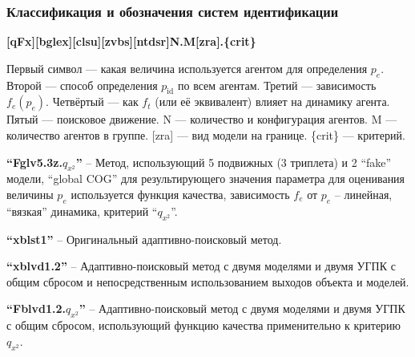 \documentclass[10pt,utf8]{beamer}
\begin{document}

\begin{frame}
  \frametitle{Классификация и обозначения систем идентификации}

  \begin{center}
    \textbf{[qFx][bglex][clsu][zvbs][ntdsr]N.M[zra].\{crit\}}
  \end{center}

  Первый символ --- какая величина используется агентом для определения $p_e$.
  Второй --- способ определения $p_\mathrm{id}$ по всем агентам.
  Третий --- зависимость $f_e(p_e)$.
  Четвёртый --- как $f_t$ (или её эквивалент) влияет на динамику агента.
  Пятый --- поисковое движение.
  N --- количество и конфигурация агентов.
  M --- количество агентов в группе.
  [zra] --- вид модели на границе.
  \{crit\} --- критерий.

  \textbf{``Fglv5.3z.$q_{x^2}$''} -- Метод, использующий 5 подвижных (3 триплета) и 2 ``fake'' модели,
  ``global COG'' для результирующего значения параметра
  для оценивания величины $p_e$ используется функция качества,
  зависимость $f_e$ от $p_e$ -- линейная, ``вязкая'' динамика, критерий ``$q_{x^2}$''.

  \textbf{``xblst1''} -- Оригинальный адаптивно-поисковый метод.

  \textbf{``xblvd1.2''} -- Адаптивно-поисковый метод с двумя моделями и двумя УГПК с общим сбросом
    и непосредственным использованием выходов объекта и моделей.

  \textbf{``Fblvd1.2.$q_{x^2}$''} -- Адаптивно-поисковый метод с двумя моделями и двумя УГПК с общим сбросом,
   использующий функцию качества применительно к критерию $q_{x^2}$.
\end{frame}




\end{document}
